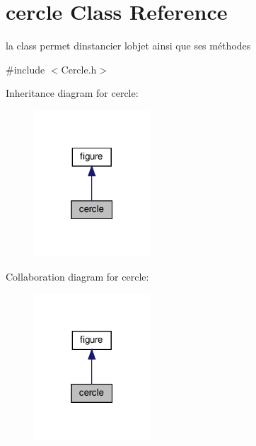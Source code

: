 \hypertarget{classcercle}{}\section{cercle Class Reference}
\label{classcercle}


la class permet d\textquotesingle{}instancier l\textquotesingle{}objet ainsi que ses méthodes  




{\ttfamily \#include $<$Cercle.\+h$>$}



Inheritance diagram for cercle\+:
\nopagebreak
\begin{figure}[H]
\begin{center}
\leavevmode
\includegraphics[width=123pt]{classcercle__inherit__graph}
\end{center}
\end{figure}


Collaboration diagram for cercle\+:
\nopagebreak
\begin{figure}[H]
\begin{center}
\leavevmode
\includegraphics[width=123pt]{classcercle__coll__graph}
\end{center}
\end{figure}
